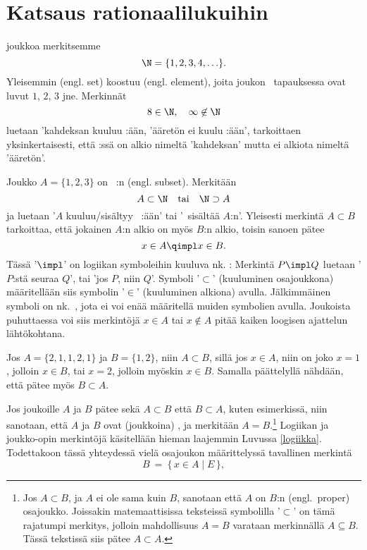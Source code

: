 \section{Katsaus rationaalilukuihin}  \label{ratluvut}
\alku
{}

 joukkoa merkitsemme
\[
\N = \{1,2,3,4,\ldots\}.
\]
Yleisemmin  (engl. set) koostuu  (engl. element), joita joukon \N\ 
tapauksessa ovat luvut $1$, $2$, $3$ jne. Merkinnät
\[
8 \in \N, \quad \infty \not\in \N
\]
luetaan 'kahdeksan kuuluu \N:ään, 'ääretön ei kuulu \N:ään', tarkoittaen yksinkertaisesti, että
\N:ssä on alkio nimeltä 'kahdeksan' mutta ei alkiota nimeltä 'ääretön'.

Joukko $A = \{1,2,3\}$ on \N\ :n  (engl. subset). Merkitään
\[
A \subset \N \quad \text{tai} \quad \N \supset A
\]
ja luetaan '$A$ kuuluu/sisältyy \N\ :ään' tai '\N\ sisältää $A$:n'. Yleisesti merkintä 
$A \subset B$ tarkoittaa, että jokainen $A$:n alkio on myös $B$:n alkio, toisin sanoen pätee
\[
x \in A \qimpl x \in B.
\]
Tässä '$\impl$' on logiikan symboleihin kuuluva nk. : Merkintä $P \impl Q$
luetaan '$P$:stä seuraa $Q$', tai 'jos $P$, niin $Q$'. Symboli '$\subset$' (kuuluminen 
osajoukkona) määritellään siis symbolin '$\in$' (kuuluminen alkiona) avulla. Jälkimmäinen 
symboli on nk.\ \kor{primitiivi}, jota ei voi enää määritellä muiden symbolien avulla. Joukoista 
puhuttaessa voi siis merkintöjä $x \in A$ tai $x \not\in A$ pitää kaiken loogisen ajattelun 
lähtökohtana. 
\begin{Exa} Jos $A = \{2,1,1,2,1\}$ ja $B = \{1,2\}$, niin $A \subset B$, sillä jos $x \in A$,
niin on joko $x=1$, jolloin $x \in B$, tai $x=2$, jolloin myöskin $x \in B$. Samalla päättelyllä
nähdään, että pätee myös $B \subset A$. \loppu \end{Exa} 
Jos joukoille $A$ ja $B$ pätee sekä $A \subset B$ että $B \subset A$, kuten esimerkissä, niin 
sanotaan, että $A$ ja $B$ ovat (joukkoina) \kor{samat}, ja merkitään $A=B$.\footnote[2]{Jos 
$A \subset B$, ja $A$ ei ole sama kuin $B$, sanotaan että $A$ on $B$:n \kor{aito} 
(engl.\ proper) osajoukko. Joissakin matemaattisissa teksteissä symbolilla '$\subset$' on tämä
rajatumpi merkitys, jolloin mahdollisuus $A=B$ varataan merkinnällä $A \subseteq B$. Tässä 
tekstissä siis pätee $A \subset A$.} 
Logiikan ja joukko-opin merkintöjä käsitellään hieman laajemmin Luvussa \ref{logiikka}. 
Todettakoon tässä yhteydessä vielä osajoukon määrittelyssä tavallinen merkintä
\[ 
B\ =\ \{\,x \in A \mid E\,\}, 
\]
